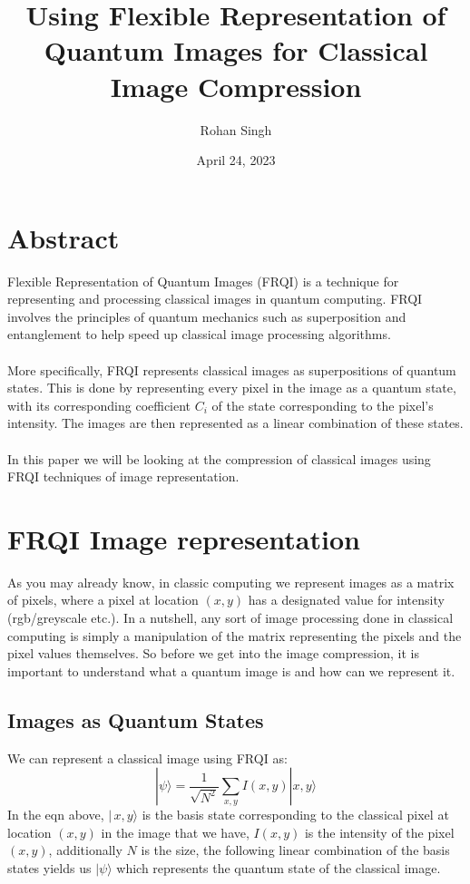 \documentclass[letterpaper, 12pt]{article}
\title{Using Flexible Representation of Quantum Images for Classical Image Compression}
\author{Rohan Singh}
\date{April 24, 2023}
\begin{document}
\maketitle

\section{Abstract}
Flexible Representation of Quantum Images (FRQI) is a technique for representing and processing classical images in quantum computing. FRQI involves the principles of quantum mechanics such as superposition and entanglement to help speed up classical image processing algorithms.\\\\
More specifically, FRQI represents classical images as superpositions of quantum states. This is done by representing every pixel in the image as a quantum state, with its corresponding coefficient $C_i$ of the state corresponding to the pixel's intensity. The images are then represented as a linear combination of these states.\\\\
In this paper we will be looking at the compression of classical images using FRQI techniques of image representation.

\section{FRQI Image representation}
As you may already know, in classic computing we represent images as a matrix of pixels, where a pixel at location $(x,y)$ has a designated value for intensity (rgb/greyscale etc.). In a nutshell, any sort of image processing done in classical computing is simply a manipulation of the matrix representing the pixels and the pixel values themselves. So before we get into the image compression, it is important to understand what a quantum image is and how can we represent it.

\subsection{Images as Quantum States}
We can represent a classical image using FRQI as:
$$
|\psi\rangle = \frac{1}{\sqrt{N^2}} \sum_{x,y} I(x,y) |x,y\rangle
$$
In the eqn above, $|\,x,y\rangle$ is the basis state corresponding to the classical pixel at location $(x,y)$ in the image that we have, $I(x,y)$ is the intensity of the pixel $(x,y)$, additionally $N$ is the size, the following linear combination of the basis states yields us $|\psi\rangle$ which represents the quantum state of the classical image.
\end{document}
